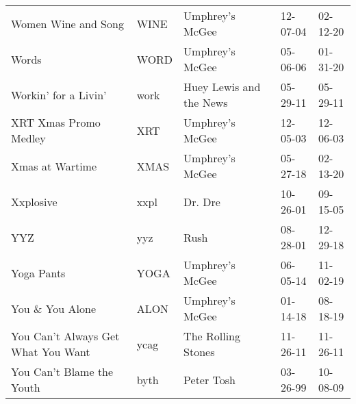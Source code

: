 \begin{longtable}{p{}p{}p{}p{}p{}}
                                                     Women Wine and Song &          WINE &                                          Umphrey's McGee &              12-07-04 &             02-12-20 \\
                                                                   Words &          WORD &                                          Umphrey's McGee &              05-06-06 &             01-31-20 \\
                                                    Workin' for a Livin' &          work &                                  Huey Lewis and the News &              05-29-11 &             05-29-11 \\
                                                   XRT Xmas Promo Medley &           XRT &                                          Umphrey's McGee &              12-05-03 &             12-06-03 \\
                                                         Xmas at Wartime &          XMAS &                                          Umphrey's McGee &              05-27-18 &             02-13-20 \\
                                                               Xxplosive &          xxpl &                                                  Dr. Dre &              10-26-01 &             09-15-05 \\
                                                                     YYZ &           yyz &                                                     Rush &              08-28-01 &             12-29-18 \\
                                                              Yoga Pants &          YOGA &                                          Umphrey's McGee &              06-05-14 &             11-02-19 \\
                                                        You \& You Alone &          ALON &                                          Umphrey's McGee &              01-14-18 &             08-18-19 \\
                                      You Can't Always Get What You Want &          ycag &                                       The Rolling Stones &              11-26-11 &             11-26-11 \\
                                               You Can't Blame the Youth &          byth &                                               Peter Tosh &              03-26-99 &             10-08-09 \\

\end{longtable}
